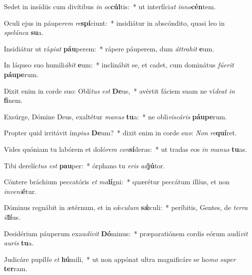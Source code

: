 \item Sedet in insídiis cum divítibus \textit{in} \textit{oc}\textbf{cúl}tis:~* ut interfíci\textit{at} \textit{in}\textit{no}\textbf{cén}tem.
\item Oculi ejus in páupe\textit{rem} \textit{re}\textbf{spí}ciunt:~* insidiátur in abscóndito, quasi leo in \textit{spe}\textit{lún}\textit{ca} \textbf{su}a.
\item Insidiátur ut rá\textit{pi}\textit{at} \textbf{páu}perem:~* rápere páuperem, dum \textit{át}\textit{tra}\textit{hit} \textbf{e}um.
\item In láqueo suo humili\textit{á}\textit{bit} \textbf{e}um:~* inclinábit se, et cadet, cum dominátus \textit{fú}\textit{e}\textit{rit} \textbf{páu}\textbf{pe}rum.
\item Dixit enim in corde suo: Oblí\textit{tus} \textit{est} \textbf{De}us,~* avértit fáciem suam ne ví\textit{de}\textit{at} \textit{in} \textbf{fi}nem.
\item Exsúrge, Dómine Deus, exaltétur \textit{ma}\textit{nus} \textbf{tu}a:~* ne obli\textit{vis}\textit{cá}\textit{ris} \textbf{páu}\textbf{pe}rum.
\item Propter quid irritávit ím\textit{pi}\textit{us} \textbf{De}um?~* dixit enim in corde su\textit{o}: \textit{Non} \textit{re}\textbf{quí}ret.
\item Vides quóniam tu labórem et doló\textit{rem} \textit{con}\textbf{sí}deras:~* ut tradas eos \textit{in} \textit{ma}\textit{nus} \textbf{tu}as.
\item Tibi derelíc\textit{tus} \textit{est} \textbf{pau}per:~* órphano tu \textit{e}\textit{ris} \textit{ad}\textbf{jú}tor.
\item Cóntere bráchium peccatóris \textit{et} \textit{ma}\textbf{lí}gni:~* quærétur peccátum illíus, et non \textit{in}\textit{ve}\textit{ni}\textbf{é}tur.
\item Dóminus regnábit in ætérnum, et in sǽ\textit{cu}\textit{lum} \textbf{sǽ}culi:~* períbitis, Gentes, de \textit{ter}\textit{ra} \textit{il}\textbf{lí}us.
\item Desidérium páuperum exau\textit{dí}\textit{vit} \textbf{Dó}minus:~* præparatiónem cordis eórum audí\textit{vit} \textit{au}\textit{ris} \textbf{tu}a.
\item Judicáre pupíl\textit{lo} \textit{et} \textbf{hú}mili,~* ut non appónat ultra magnificáre se ho\textit{mo} \textit{su}\textit{per} \textbf{ter}ram.
